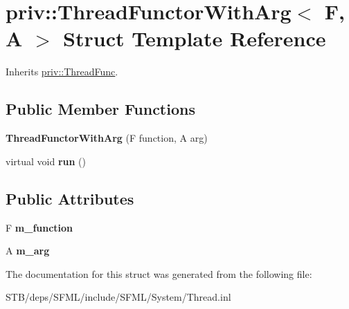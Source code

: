 \hypertarget{structpriv_1_1_thread_functor_with_arg}{\section{priv\+:\+:Thread\+Functor\+With\+Arg$<$ F, A $>$ Struct Template Reference}
\label{structpriv_1_1_thread_functor_with_arg}
}


Inherits \hyperlink{structpriv_1_1_thread_func}{priv\+::\+Thread\+Func}.

\subsection*{Public Member Functions}
\begin{DoxyCompactItemize}
\item 
\hypertarget{structpriv_1_1_thread_functor_with_arg_ae3745753b77880cdfda6f10d72748efa}{{\bfseries Thread\+Functor\+With\+Arg} (F function, A arg)}\label{structpriv_1_1_thread_functor_with_arg_ae3745753b77880cdfda6f10d72748efa}

\item 
\hypertarget{structpriv_1_1_thread_functor_with_arg_a0f8bb6ba36819e80016528bab8b0bd4f}{virtual void {\bfseries run} ()}\label{structpriv_1_1_thread_functor_with_arg_a0f8bb6ba36819e80016528bab8b0bd4f}

\end{DoxyCompactItemize}
\subsection*{Public Attributes}
\begin{DoxyCompactItemize}
\item 
\hypertarget{structpriv_1_1_thread_functor_with_arg_ab12992af3112f15df4b6f0dbce3137b9}{F {\bfseries m\+\_\+function}}\label{structpriv_1_1_thread_functor_with_arg_ab12992af3112f15df4b6f0dbce3137b9}

\item 
\hypertarget{structpriv_1_1_thread_functor_with_arg_ac598f7701f976320bc3964733b9ae9ae}{A {\bfseries m\+\_\+arg}}\label{structpriv_1_1_thread_functor_with_arg_ac598f7701f976320bc3964733b9ae9ae}

\end{DoxyCompactItemize}


The documentation for this struct was generated from the following file\+:\begin{DoxyCompactItemize}
\item 
S\+T\+B/deps/\+S\+F\+M\+L/include/\+S\+F\+M\+L/\+System/Thread.\+inl\end{DoxyCompactItemize}

